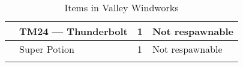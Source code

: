 \begin{longtable}{|| l l l l ||}%
\hline%
&TM24 — Thunderbolt&1&Not respawnable\\%
\hline%
&Super Potion&1&Not respawnable\\%
\hline%
\endhead%
\hline%
\caption{Items in Valley Windworks}%
\label{tab:ValleyWindworksItems}%
\end{longtable}